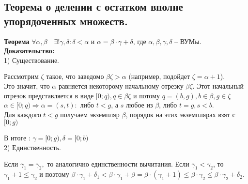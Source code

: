 \subsection{Теорема о делении с остатком вполне упорядоченных множеств.}

\textbf{Теорема} $\forall \alpha, \beta \quad \exists ! \gamma, \delta : \delta < \alpha$ и $\alpha = \beta \cdot \gamma + \delta$, где $\alpha, \beta, \gamma, \delta$ -- ВУМы.\\

\textbf{Доказательство:}\\

1) Существование.

Рассмотрим $\zeta$ такое, что заведомо $\beta \zeta > \alpha$ (например, подойдет $\zeta = \alpha + 1$).\\

Это значит, что $\alpha$ равняется некоторому начальному отрезку $\beta \zeta$. Этот начальный отрезок представляется в виде $[0;q), q \in \beta \zeta$ и потому $q = (b, g), b \in \beta, g \in \zeta$\\

$\alpha \in [0;q) \Rightarrow \alpha = (s, t) :$ либо $t < g$, а $s$ любое из $\beta$, либо $t = g, s < b$.\\

Для каждого $t < g$ получаем экземпляр $\beta$, порядок на этих экземплярах взят с $[0;g)$

В итоге : $\gamma = [0;g), \delta = [0;b)$\\

2) Единственность.

Если $\gamma_1 = \gamma_2,$ то аналогично единственности вычитания.
Если $\gamma_1 < \gamma_2$, то $\gamma_1 + 1 \leq \gamma_2$ и поэтому $\beta \cdot \gamma_1 + \delta_1 < \beta \cdot \gamma_1 + \beta = \beta \cdot (\gamma_1 + 1) \leq \beta \cdot \gamma_2 \leq \beta \cdot \gamma_2 + \delta_2$.